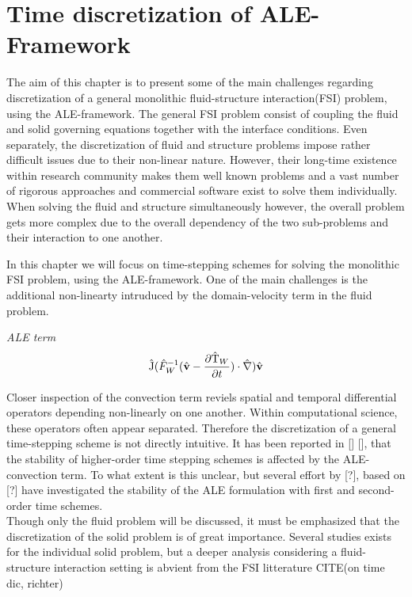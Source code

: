 \chapter{Time discretization of ALE-Framework}

The aim of this chapter is to present some of the main challenges regarding discretization of a general monolithic fluid-structure interaction(FSI) problem, using the ALE-framework. The general FSI problem consist of coupling the fluid and solid governing equations together with the interface conditions. Even separately, the discretization of fluid and structure problems impose rather difficult issues due to their non-linear nature. However, their long-time existence within research community makes them well known problems and a vast number of rigorous approaches and commercial  software exist to solve them individually. When solving the fluid and structure simultaneously however, the overall problem gets more complex due to the overall dependency of the two sub-problems and their interaction to one another. 

In this chapter we will focus on time-stepping schemes for solving the monolithic FSI problem, using the ALE-framework.   One of the main challenges is the additional non-linearty intruduced by the domain-velocity term in the fluid problem. 
\begin{prob}
\textit{ALE term}\begin{align*}
\text{\^{J}} (\hat{F}_W^{-1}(\hat{\mathbf{v}} - \frac{\partial \text{\^{T}}_W}{\partial t}) \cdot \hat{\nabla}) \hat{\mathbf{v}}
\end{align*} 
\end{prob}
Closer inspection of the convection term reviels spatial and temporal differential operators depending non-linearly on one another. Within computational science, these operators often appear separated. Therefore the discretization of a general time-stepping scheme  is not directly intuitive.
It has been reported in [] [], that the stability of higher-order time stepping schemes is affected by the ALE-convection term. To what extent is this unclear, but several effort by [?], based on [?] have investigated the stability of the ALE formulation with first and second-order time schemes. \\
Though only the fluid problem will be discussed, it must be emphasized that the discretization of the solid problem is of great importance. Several studies exists for the individual solid problem, but a deeper analysis considering a fluid-structure interaction setting is abvient from the FSI litterature CITE(on time dic, richter) 




